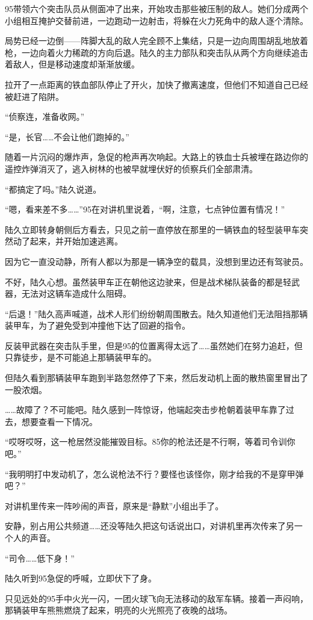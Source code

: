 95带领六个突击队员从侧面冲了出来，开始攻击那些被压制的敌人。她们分成两个小组相互掩护交替前进，一边跑动一边射击，将躲在火力死角中的敌人逐个清除。

局势已经一边倒——阵脚大乱的敌人完全顾不上集结，只是一边向周围胡乱地放着枪，一边向着火力稀疏的方向后退。陆久的主力部队和突击队从两个方向继续追击着敌人，但是移动速度却渐渐放缓。

拉开了一点距离的铁血部队停止了开火，加快了撤离速度，但他们不知道自己已经被赶进了陷阱。

“侦察连，准备收网。”

“是，长官……不会让他们跑掉的。”

随着一片沉闷的爆炸声，急促的枪声再次响起。大路上的铁血士兵被埋在路边你的遥控炸弹消灭了，逃入树林的也被早就埋伏好的侦察兵们全部肃清。

“都搞定了吗。”陆久说道。

“嗯，看来差不多……”95在对讲机里说着，“啊，注意，七点钟位置有情况！”

陆久立即转身朝侧后方看去，只见之前一直停放在那里的一辆铁血的轻型装甲车突然动了起来，并开始加速逃离。

因为它一直没动静，所有人都以为那是一辆净空的载具，没想到里边还有驾驶员。

不好，陆久心想。虽然装甲车正在朝他这边驶来，但是战术梯队装备的都是轻武器，无法对这辆车造成什么阻碍。

“后退！”陆久高声喊道，战术人形们纷纷朝周围散去。陆久知道他们无法阻挡那辆装甲车，为了避免受到冲撞他下达了回避的指令。

反装甲武器在突击队手里，但是95的位置离得太远了……虽然她们在努力追赶，但只靠徒步，是不可能追上那辆装甲车的。

但陆久看到那辆装甲车跑到半路忽然停了下来，然后发动机上面的散热窗里冒出了一股浓烟。

……故障了？不可能吧。陆久感到一阵惊讶，他端起突击步枪朝着装甲车靠了过去，想要查看一下情况。

“哎呀哎呀，这一枪居然没能摧毁目标。85你的枪法还是不行啊，等着司令训你吧。”

“我明明打中发动机了，怎么说枪法不行？要怪也该怪你，刚才给我的不是穿甲弹吧？”

对讲机里传来一阵吵闹的声音，原来是“静默”小组出手了。

安静，别占用公共频道……还没等陆久把这句话说出口，对讲机里再次传来了另一个人的声音。

“司令……低下身！”

陆久听到95急促的呼喊，立即伏下了身。

只见远处的95手中火光一闪，一团火球飞向无法移动的敌军车辆。接着一声闷响，那辆装甲车熊熊燃烧了起来，明亮的火光照亮了夜晚的战场。

